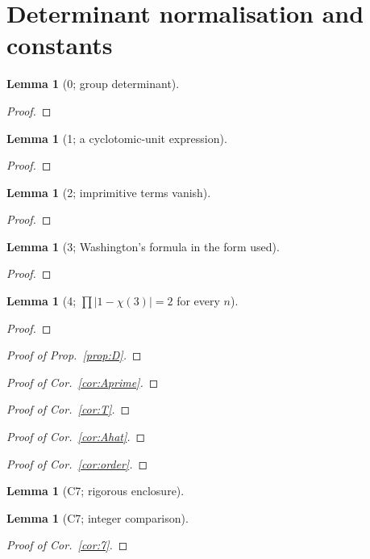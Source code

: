 \documentclass[11pt]{amsart}
\newtheorem{lemma}[theorem]{Lemma}
\theoremstyle{remark}\newtheorem{remark}[theorem]{Remark}
\theoremstyle{definition}\newtheorem{definition}[theorem]{Definition}
\providecommand{\proofsdir}{../../proofs} %
\begin{document}
\section{Determinant normalisation and constants}\label{app:D}
\begin{lemma}[0; group determinant]\label{lem:D0}

\end{lemma}
\begin{proof}

\end{proof}
\begin{lemma}[1; a cyclotomic-unit expression]\label{lem:D1}

\end{lemma}
\begin{proof}

\end{proof}
\begin{lemma}[2; imprimitive terms vanish]\label{lem:D2}

\end{lemma}
\begin{proof}

\end{proof}
\begin{lemma}[3; Washington's formula in the form used]\label{lem:D3}

\end{lemma}
\begin{proof}

\end{proof}
\begin{lemma}[4; $\prod|1-\chi(3)|=2$ for every $n$]\label{lem:prod13}

\end{lemma}
\begin{proof}

\end{proof}
\begin{proof}[Proof of Prop.~\ref{prop:D}]

\end{proof}
\begin{proof}[Proof of Cor.~\ref{cor:Aprime}]

\end{proof}
\begin{proof}[Proof of Cor.~\ref{cor:T}]

\end{proof}
\begin{proof}[Proof of Cor.~\ref{cor:Ahat}]

\end{proof}
\begin{proof}[Proof of Cor.~\ref{cor:order}]

\end{proof}
\begin{lemma}[C7; rigorous enclosure]\label{lem:C7}

\end{lemma}
\begin{lemma}[C7; integer comparison]\label{lem:C7int}

\end{lemma}
\par{}\par
\begin{proof}[Proof of Cor.~\ref{cor:7}]

\end{proof}
\end{document}

